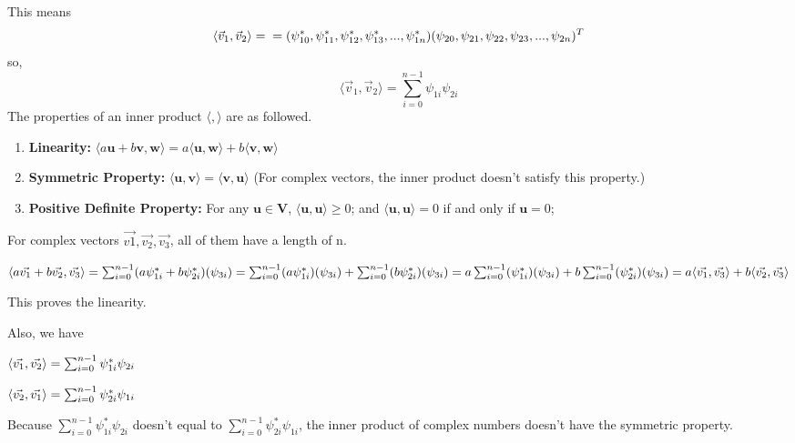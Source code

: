 \documentclass{article}
\begin{document}
\begin{enumerate}
          This means
          \[
              \langle \vec{v}_1,\vec{v}_2 \rangle=\\=(\psi_{10}^*,\psi_{11}^*,\psi_{12}^*,\psi_{13}^*,...,\psi_{1n}^*)(\psi_{20},\psi_{21},\psi_{22},\psi_{23},...,\psi_{2n})^T
          \]
          so,
          \[\langle \vec{v}_1,\vec{v}_2 \rangle=\sum_{i=0}^{n-1}\psi_{1i}\psi_{2i}\]
          The properties of an inner product $\langle,\rangle$ are as followed\cite{ref1}.
          \begin{enumerate}
              \item \textbf{Linearity:} $\langle a\mathbf{u}+b\mathbf{v},\mathbf{w}\rangle=a\langle \mathbf{u,w}\rangle+b\langle \mathbf{v,w}\rangle$
              \item \textbf{Symmetric Property: }$\langle \mathbf{u,v}\rangle=\langle \mathbf{v,u}\rangle$ (For  complex vectors, the inner product doesn't satisfy this property.)
              \item \textbf{Positive Definite Property: } For any $\mathbf{u\in V}$, $\langle \mathbf{u,u}\rangle\geq0$;
                    and $\langle \mathbf{u,u}\rangle=0$ if and only if $\mathbf{u}=0$;
          \end{enumerate}
          For complex vectors $\vec{v1},\vec{v_2},\vec{v_3}$, all of them have a length of n.

          $\langle a\vec{v_1}+b\vec{v_2},\vec{v_3}\rangle
              \\=\sum_{i=0}^{n-1}(a\psi_{1i}^*+b\psi_{2i}^*)(\psi_{3i})
              \\=\sum_{i=0}^{n-1}(a\psi_{1i}^*)(\psi_{3i})+\sum_{i=0}^{n-1}(b\psi_{2i}^*)(\psi_{3i})
              \\=a\sum_{i=0}^{n-1}(\psi_{1i}^*)(\psi_{3i})+b\sum_{i=0}^{n-1}(\psi_{2i}^*)(\psi_{3i})
              \\=a\langle\vec{v_1},\vec{v_3}\rangle+b\langle\vec{v_2},\vec{v_3}\rangle
          $

          This proves the linearity.

          Also, we have

          $\langle \vec{v_1},\vec{v_2}\rangle
              \\=\sum_{i=0}^{n-1}\psi_{1i}^*\psi_{2i}$

          $
          \langle\vec{v_2},\vec{v_1}\rangle
              \\=\sum_{i=0}^{n-1}\psi_{2i}^*\psi_{1i}
          $

          Because $\sum_{i=0}^{n-1}\psi_{1i}^*\psi_{2i}$ doesn't equal to $\sum_{i=0}^{n-1}\psi_{2i}^*\psi_{1i}$, the inner product of complex numbers doesn't have the symmetric property.


\end{enumerate}
\end{document}

